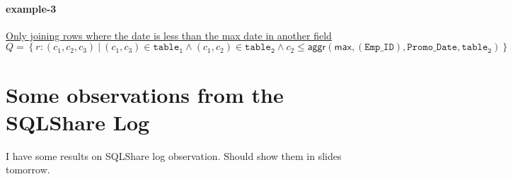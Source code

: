 \documentclass[letter, notitlepage]{article}
\begin{document}
\paragraph{example-3} \href{http://stackoverflow.com/questions/31941909/only-joining-rows-where-the-date-is-less-than-the-max-date-in-another-field}{Only joining rows where the date is less than the max date in another field}
\[
	Q = \left\{r:(c_1,c_2,c_3) ~|~ (c_1, c_3)\in \mathtt{table_1} \land (c_1, c_2)\in \mathtt{table_2} \land c_2 \le \mathsf{aggr}(\mathsf{max}, (\mathtt{Emp\_ID}), \mathtt{Promo\_Date}, \mathtt{table_2}) \right\}
\]

\section{Some observations from the SQLShare Log}
I have some results on SQLShare log observation. Should show them in slides tomorrow.
\end{document}
